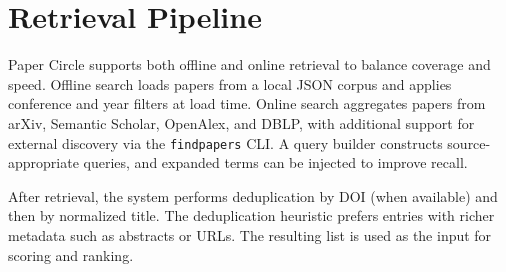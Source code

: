 \section{Retrieval Pipeline}
Paper Circle supports both offline and online retrieval to balance coverage and speed. Offline search loads papers from a local JSON corpus and applies conference and year filters at load time. Online search aggregates papers from arXiv, Semantic Scholar, OpenAlex, and DBLP, with additional support for external discovery via the \texttt{findpapers} CLI. A query builder constructs source-appropriate queries, and expanded terms can be injected to improve recall.

After retrieval, the system performs deduplication by DOI (when available) and then by normalized title. The deduplication heuristic prefers entries with richer metadata such as abstracts or URLs. The resulting list is used as the input for scoring and ranking.
